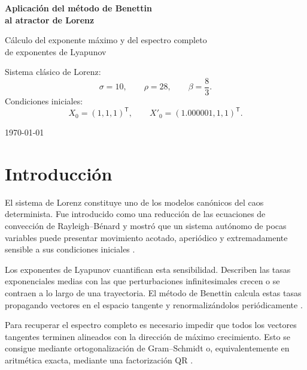 \documentclass[12pt,a4paper,oneside]{report}
\numberwithin{equation}{chapter}
\newcommand{\trans}{\mathsf{T}}
\begin{document}
\begin{titlepage}
    \centering
    \vspace*{1.8cm}
    {\Huge\bfseries Aplicación del método de Benettin\\[0.25cm] al atractor de Lorenz\par}
    
    \vspace{0.7cm}
    {\Large Cálculo del exponente máximo y del espectro completo\\ de exponentes de Lyapunov\par}
    \vfill
    \begin{minipage}{0.95\textwidth}
        \centering
        Sistema clásico de Lorenz:
        \[
            \sigma=10,\qquad \rho=28,\qquad \beta=\frac{8}{3}.
        \]
        Condiciones iniciales:
        \[
            X_0=(1,1,1)^{\trans},\qquad X'_0=(1.000001,1,1)^{\trans}.
        \]
    \end{minipage}
    \vfill
    
    {\large \today\par}
\end{titlepage}

\tableofcontents
\clearpage

\chapter*{Introducción}

El sistema de Lorenz constituye uno de los modelos canónicos del caos determinista. Fue introducido como una reducción de las ecuaciones de convección de Rayleigh--Bénard y mostró que un sistema autónomo de pocas variables puede presentar movimiento acotado, aperiódico y extremadamente sensible a sus condiciones iniciales \cite{lorenz1963,kuznetsov2020}.

Los exponentes de Lyapunov cuantifican esta sensibilidad. Describen las tasas exponenciales medias con las que perturbaciones infinitesimales crecen o se contraen a lo largo de una trayectoria. El método de Benettin calcula estas tasas propagando vectores en el espacio tangente y renormalizándolos periódicamente \cite{benettin1980,skokos2010}.

Para recuperar el espectro completo es necesario impedir que todos los vectores tangentes terminen alineados con la dirección de máximo crecimiento. Esto se consigue mediante ortogonalización de Gram--Schmidt o, equivalentemente en aritmética exacta, mediante una factorización QR \cite{semenov2022,gatica2026}.
\end{document}
